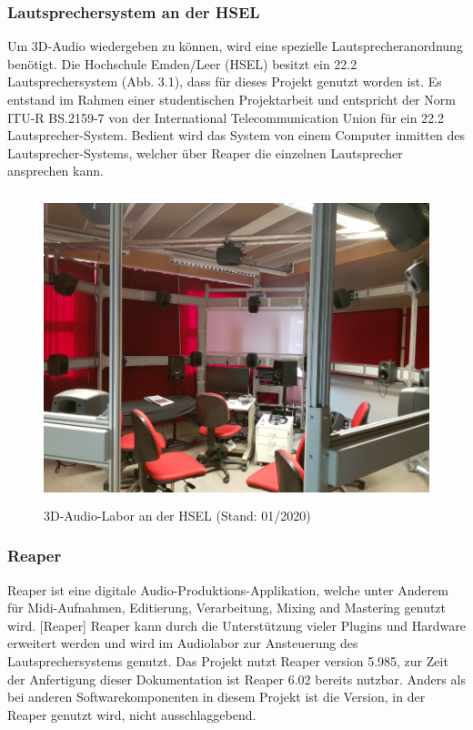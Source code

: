 \documentclass[11pt, titlepage, fleqn]{report}
\begin{document}
                \subsubsection{Lautsprechersystem an der HSEL}
                    Um 3D-Audio wiedergeben zu können, wird eine spezielle Lautsprecheranordnung benötigt. Die Hochschule Emden/Leer (HSEL) besitzt ein 
                    22.2 Lautsprechersystem (Abb. 3.1), dass für dieses Projekt genutzt worden ist. Es entstand im Rahmen einer studentischen Projektarbeit und entspricht 
                    der Norm ITU-R BS.2159-7 von der International Telecommunication Union für ein 22.2 Lautsprecher-System.
                    Bedient wird das System von einem Computer inmitten des Lautsprecher-Systems, welcher über Reaper die einzelnen Lautsprecher ansprechen kann.
                    \begin{figure}[htbp]
                        \centering
                        \includegraphics[height=9cm]{./img/Studio.png}
                        \caption{3D-Audio-Labor an der HSEL (Stand: 01/2020)\label{fig:MR}}
                    \end{figure}
                \subsubsection{Reaper}
                \label{sec:3.1.2}
                    Reaper ist eine digitale Audio-Produktions-Applikation, welche unter Anderem für Midi-Aufnahmen, Editierung, Verarbeitung, Mixing and Mastering 
                    genutzt wird. [Reaper]\newline 
                    Reaper kann durch die Unterstützung vieler Plugins und Hardware erweitert werden und wird im Audiolabor zur Ansteuerung des Lautsprechersystems genutzt.
                    Das Projekt nutzt Reaper version 5.985, zur Zeit der Anfertigung dieser Dokumentation ist Reaper 6.02 bereits nutzbar. Anders als bei anderen 
                    Softwarekomponenten in diesem Projekt ist die Version, in der Reaper genutzt wird, nicht ausschlaggebend.                
\end{document}
